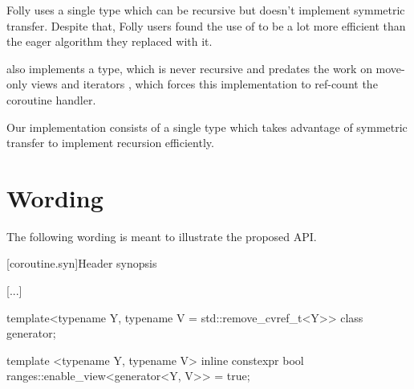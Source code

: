 \documentclass{wg21}
\begin{document}
Folly uses a single  type which can be recursive but doesn't implement symmetric transfer. Despite that,
Folly users found the use of  to be a lot more efficient than the eager algorithm they replaced with it.

 also implements a  type, which is never recursive and predates the work on move-only views and
iterators \cite{P1456R1}, \cite{P1207R0} which forces this implementation to ref-count the coroutine handler.

Our implementation \cite{Implementation} consists of a single type which takes advantage of symmetric transfer to implement
recursion efficiently.

\section{Wording}

The following wording is meant to illustrate the proposed API.


[coroutine.syn]{Header  synopsis}

[...]

\begin{codeblock}
    
namespace std {

\end{codeblock}  

\begin{addedblock}
\begin{codeblock}  
template<typename Y, typename V  = std::remove_cvref_t<Y>>
class generator;

template <typename Y, typename V>
inline constexpr bool ranges::enable_view<generator<Y, V>> = true;

\end{codeblock}
\end{addedblock}
\begin{codeblock}
    
}
\end{codeblock}
\end{document}
